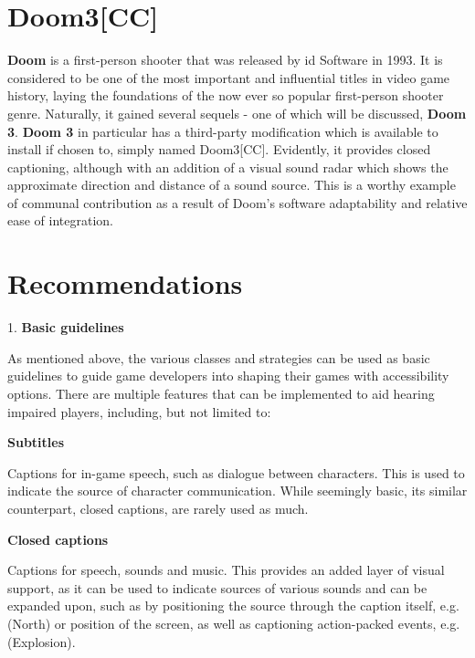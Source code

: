 \documentclass{scrartcl}
\begin{document}
\section{Doom3[CC]}
\textbf{Doom} is a first-person shooter that was released by id Software in 1993. It is considered to be one of the most important and influential titles in video game history, laying the foundations of the now ever so popular first-person shooter genre. Naturally, it gained several sequels - one of which will be discussed, \textbf{Doom 3}. \textbf{Doom 3} in particular has a third-party modification which is available to install if chosen to, simply named Doom3[CC]. Evidently, it provides closed captioning, although with an addition of a visual sound radar which shows the approximate direction and distance of a sound source. This is a worthy example of communal contribution as a result of Doom's software adaptability and relative ease of integration. 


\section{Recommendations}


\hspace{6mm}1.	\textbf{Basic guidelines}

\hspace{-4mm}As mentioned above, the various classes and strategies can be used as basic guidelines to guide game developers into shaping their games with accessibility options. There are multiple features that can be implemented to aid hearing impaired players, including, but not limited to:

\hspace{-4mm}\textbf{Subtitles}

\hspace{-4mm}Captions for in-game speech, such as dialogue between characters. This is used to indicate the source of character communication. While seemingly basic, its similar counterpart, closed captions, are rarely used as much.

\hspace{-4mm}\textbf{Closed captions}

\hspace{-4mm}Captions for speech, sounds and music. This provides an added layer of visual support, as it can be used to indicate sources of various sounds and can be expanded upon, such as by positioning the source through the caption itself, e.g. (North) or position of the screen, as well as captioning action-packed events, e.g. (Explosion). \cite{Yuan}
\end{document}
